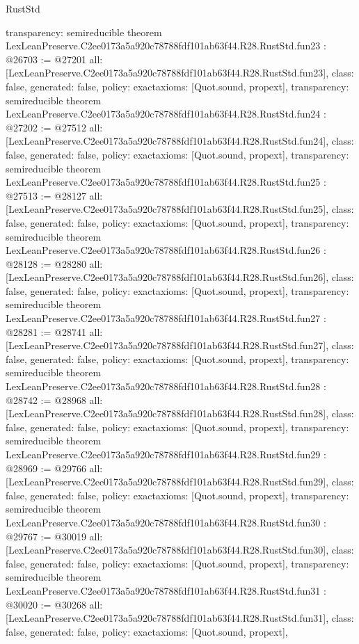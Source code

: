 \begin{lexlean}{RustStd}
\begin{coremodule}
{  transparency: semireducible
}
theorem LexLeanPreserve.C2ee0173a5a920c78788fdf101ab63f44.R28.RustStd.fun23 : @26703 := @27201 {
  all: [LexLeanPreserve.C2ee0173a5a920c78788fdf101ab63f44.R28.RustStd.fun23],
  class: false,
  generated: false,
  policy: exact{axioms: [Quot.sound, propext]},
  transparency: semireducible
}
theorem LexLeanPreserve.C2ee0173a5a920c78788fdf101ab63f44.R28.RustStd.fun24 : @27202 := @27512 {
  all: [LexLeanPreserve.C2ee0173a5a920c78788fdf101ab63f44.R28.RustStd.fun24],
  class: false,
  generated: false,
  policy: exact{axioms: [Quot.sound, propext]},
  transparency: semireducible
}
theorem LexLeanPreserve.C2ee0173a5a920c78788fdf101ab63f44.R28.RustStd.fun25 : @27513 := @28127 {
  all: [LexLeanPreserve.C2ee0173a5a920c78788fdf101ab63f44.R28.RustStd.fun25],
  class: false,
  generated: false,
  policy: exact{axioms: [Quot.sound, propext]},
  transparency: semireducible
}
theorem LexLeanPreserve.C2ee0173a5a920c78788fdf101ab63f44.R28.RustStd.fun26 : @28128 := @28280 {
  all: [LexLeanPreserve.C2ee0173a5a920c78788fdf101ab63f44.R28.RustStd.fun26],
  class: false,
  generated: false,
  policy: exact{axioms: [Quot.sound, propext]},
  transparency: semireducible
}
theorem LexLeanPreserve.C2ee0173a5a920c78788fdf101ab63f44.R28.RustStd.fun27 : @28281 := @28741 {
  all: [LexLeanPreserve.C2ee0173a5a920c78788fdf101ab63f44.R28.RustStd.fun27],
  class: false,
  generated: false,
  policy: exact{axioms: [Quot.sound, propext]},
  transparency: semireducible
}
theorem LexLeanPreserve.C2ee0173a5a920c78788fdf101ab63f44.R28.RustStd.fun28 : @28742 := @28968 {
  all: [LexLeanPreserve.C2ee0173a5a920c78788fdf101ab63f44.R28.RustStd.fun28],
  class: false,
  generated: false,
  policy: exact{axioms: [Quot.sound, propext]},
  transparency: semireducible
}
theorem LexLeanPreserve.C2ee0173a5a920c78788fdf101ab63f44.R28.RustStd.fun29 : @28969 := @29766 {
  all: [LexLeanPreserve.C2ee0173a5a920c78788fdf101ab63f44.R28.RustStd.fun29],
  class: false,
  generated: false,
  policy: exact{axioms: [Quot.sound, propext]},
  transparency: semireducible
}
theorem LexLeanPreserve.C2ee0173a5a920c78788fdf101ab63f44.R28.RustStd.fun30 : @29767 := @30019 {
  all: [LexLeanPreserve.C2ee0173a5a920c78788fdf101ab63f44.R28.RustStd.fun30],
  class: false,
  generated: false,
  policy: exact{axioms: [Quot.sound, propext]},
  transparency: semireducible
}
theorem LexLeanPreserve.C2ee0173a5a920c78788fdf101ab63f44.R28.RustStd.fun31 : @30020 := @30268 {
  all: [LexLeanPreserve.C2ee0173a5a920c78788fdf101ab63f44.R28.RustStd.fun31],
  class: false,
  generated: false,
  policy: exact{axioms: [Quot.sound, propext]},
}
\end{coremodule}
\end{lexlean}
